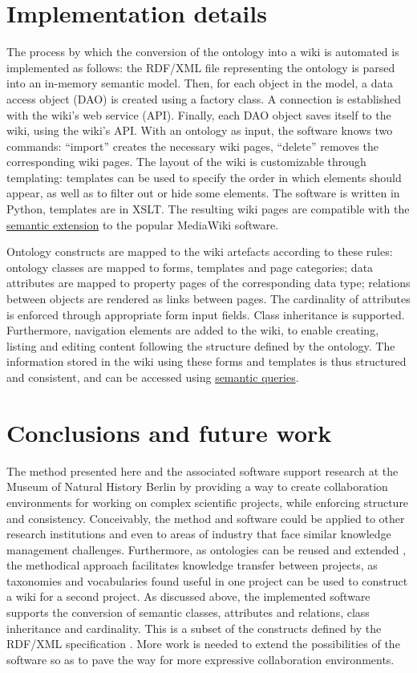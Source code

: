 \documentclass[fleqn,10pt,lineno]{wlpeerj} %
\begin{document}
\section{Implementation details}
The process by which the conversion of the ontology into a wiki is automated is implemented as follows: the RDF/XML file representing the ontology is parsed into an in-memory semantic model. Then, for each object in the model, a data access object (DAO) is created using a factory class. A connection is established with the wiki's web service (API). Finally, each DAO object saves itself to the wiki, using the wiki's API. With an ontology as input, the software knows two commands: ``import'' creates the necessary wiki pages, ``delete'' removes the corresponding wiki pages. The layout of the wiki is customizable through templating: templates can be used to specify the order in which elements should appear, as well as to filter out or hide some elements. The software is written in Python, templates are in XSLT. The resulting wiki pages are compatible with the \href{https://www.semantic-mediawiki.org}{semantic extension} to the popular MediaWiki software.

Ontology constructs are mapped to the wiki artefacts according to these rules: ontology classes are mapped to forms, templates and page categories; data attributes are mapped to property pages of the corresponding data type; relations between objects are rendered as links between pages. The cardinality of attributes is enforced through appropriate form input fields. Class inheritance is supported. Furthermore, navigation elements are added to the wiki, to enable creating, listing and editing content following the structure defined by the ontology. The information stored in the wiki using these forms and templates is thus structured and consistent, and can be accessed using \href{https://www.semantic-mediawiki.org}{semantic queries}.

\section{Conclusions and future work}
The method presented here and the associated software support research at the Museum of Natural History Berlin by providing a way to create collaboration environments for working on complex scientific projects, while enforcing structure and consistency. Conceivably, the method and software could be applied to other research institutions and even to areas of industry that face similar knowledge management challenges. Furthermore, as ontologies can be reused and extended \citep{noy2001ontology}, the methodical approach facilitates knowledge transfer between projects, as taxonomies and vocabularies found useful in one project can be used to construct a wiki for a second project. As discussed above, the implemented software supports the conversion of semantic classes, attributes and relations, class inheritance and cardinality. This is a subset of the constructs defined by the RDF/XML specification \citep{rdfspec}. More work is needed to extend the possibilities of the software so as to pave the way for more expressive collaboration environments.
\end{document}
